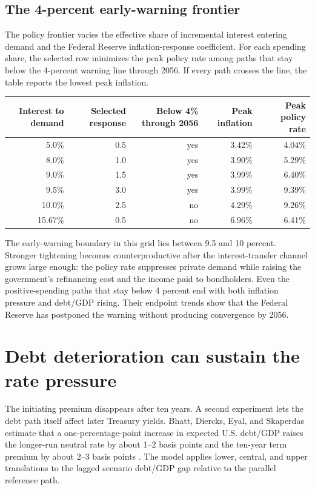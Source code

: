 \documentclass[11pt]{article}
\begin{document}
\subsection*{The 4-percent early-warning frontier}

The policy frontier varies the effective share of incremental interest entering demand and
the Federal Reserve inflation-response coefficient.  For each spending share, the selected
row minimizes the peak policy rate among paths that stay below the 4-percent warning line
through 2056.  If every path crosses the line, the table reports the lowest peak inflation.

\begin{center}
\begin{tabular}{rrrrr}
\toprule
Interest to demand & Selected response & Below 4\% through 2056 & Peak inflation & Peak policy rate \\
\midrule
5.0\%  & 0.5 & yes & 3.42\% & 4.04\% \\
8.0\%  & 1.0 & yes & 3.90\% & 5.29\% \\
9.0\%  & 1.5 & yes & 3.99\% & 6.40\% \\
9.5\%  & 3.0 & yes & 3.99\% & 9.39\% \\
10.0\% & 2.5 & no  & 4.29\% & 9.26\% \\
15.67\% & 0.5 & no & 6.96\% & 6.41\% \\
\bottomrule
\end{tabular}
\end{center}

The early-warning boundary in this grid lies between 9.5 and 10 percent.  Stronger
tightening becomes counterproductive after the interest-transfer channel grows large enough:
the policy rate suppresses private demand while raising the government's refinancing cost
and the income paid to bondholders.  Even the positive-spending paths that stay below 4
percent end with both inflation pressure and debt/GDP rising.  Their endpoint trends show
that the Federal Reserve has postponed the warning without producing convergence by 2056.

\section{Debt deterioration can sustain the rate pressure}

The initiating premium disappears after ten years.  A second experiment lets the debt path
itself affect later Treasury yields.  Bhatt, Diercks, Eyal, and Skaperdas estimate that a
one-percentage-point increase in expected U.S. debt/GDP raises the longer-run neutral rate by
about 1--2 basis points and the ten-year term premium by about 2--3 basis points
\cite{fedDebtRates}.  The model applies lower, central, and upper translations to the lagged
scenario debt/GDP gap relative to the parallel reference path.
\end{document}
